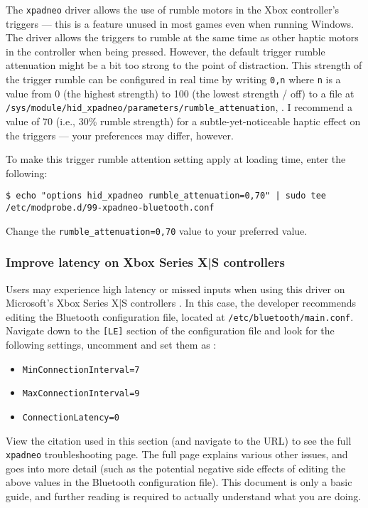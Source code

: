 \documentclass[a4paper]{article}
\begin{document}
The \lstinline|xpadneo| driver allows the use of rumble motors in the Xbox controller's triggers --- this is a feature unused in most games even when running Windows.
The driver allows the triggers to rumble at the same time as other haptic motors in the controller when being pressed.
However, the default trigger rumble attenuation might be a bit too strong to the point of distraction.
This strength of the trigger rumble can be configured in real time by writing \lstinline|0,n|  where \lstinline|n| is a value from 0 (the highest strength) to 100 (the lowest strength / off) to a file at \lstinline|/sys/module/hid_xpadneo/parameters/rumble_attenuation|, \cite{xpadneo-troubleshooting}.
I recommend a value of 70 (i.e., 30\% rumble strength) for a subtle-yet-noticeable haptic effect on the triggers --- your preferences may differ, however.

To make this trigger rumble attention setting apply at loading time, enter the following: \cite{xpadneo-troubleshooting}

\begin{lstlisting}
$ echo "options hid_xpadneo rumble_attenuation=0,70" | sudo tee /etc/modprobe.d/99-xpadneo-bluetooth.conf
\end{lstlisting}
Change the \lstinline|rumble_attenuation=0,70| value to your preferred value.

\subsubsection{Improve latency on Xbox Series X|S controllers}

Users may experience high latency or missed inputs when using this driver on Microsoft's Xbox Series X|S controllers \cite{xpadneo-troubleshooting}. In this case, the developer recommends editing the Bluetooth configuration file, located at \lstinline|/etc/bluetooth/main.conf|. Navigate down to the \lstinline|[LE]| section of the configuration file and look for the following settings, uncomment and set them as \cite{xpadneo-troubleshooting}:
\begin{itemize}
    \item \lstinline|MinConnectionInterval=7|
    \item \lstinline|MaxConnectionInterval=9|
    \item \lstinline|ConnectionLatency=0|
\end{itemize}

View the citation used in this section (and navigate to the URL) to see the full \lstinline|xpadneo| troubleshooting page.
The full page explains various other issues, and goes into more detail (such as the potential negative side effects of editing the above values in the Bluetooth configuration file).
This document is only a basic guide, and further reading is required to actually understand what you are doing.
\end{document}
